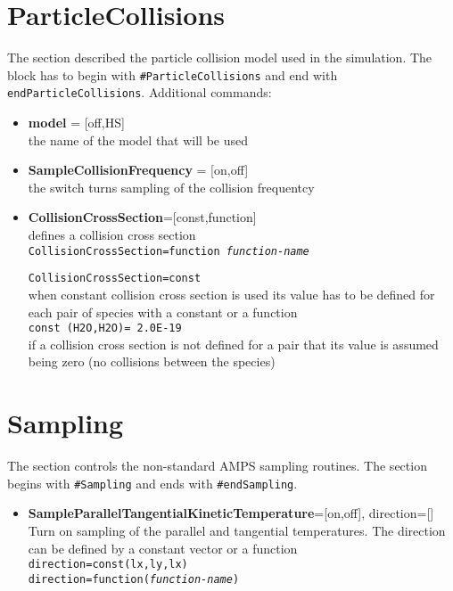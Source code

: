 \section{ParticleCollisions}
The section described the particle collision model used in the simulation. The block has to begin with {\tt \#ParticleCollisions} and end with {\tt endParticleCollisions}. Additional commands:
\begin{itemize}
\item {\bf model} = [off,HS] \\ the name of the model that will be used
\item {\bf SampleCollisionFrequency} = [on,off] \\ the switch turns sampling of the collision frequentcy
\item{\bf CollisionCrossSection}=[const,function] \\ defines a collision cross section \\ {\tt CollisionCrossSection=function {\it function-name}} 

{\tt CollisionCrossSection=const} \\ when constant collision cross section is used its value has to be defined for each pair of species with a constant or a function \\ {\tt const (H2O,H2O)= 2.0E-19} \\ if a collision cross section is not defined for a pair that its value is assumed being zero (no collisions between the species)
\end{itemize}


\section{Sampling}
The section controls the non-standard AMPS sampling routines. The section begins with {\tt \#Sampling} and ends with {\tt \#endSampling}.

\begin{itemize}
\item {\bf SampleParallelTangentialKineticTemperature}=[on,off], direction=[] \\
Turn on sampling of the parallel and tangential temperatures. The direction can be defined by a constant vector or a function \\ {\tt direction=const(lx,ly,lx)} \\ {\tt direction=function({\it function-name})}

\end{itemize}



